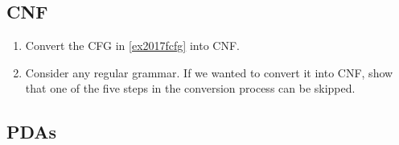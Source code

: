 \subsection{CNF}

\begin{enumerate}[resume]

\item {} Convert the CFG in \cref{ex2017fcfg} into CNF.

\item {} Consider any regular grammar. If we wanted to convert it into CNF, show that one of the five steps in the conversion process can be skipped.

\end{enumerate}

\subsection{PDAs}

